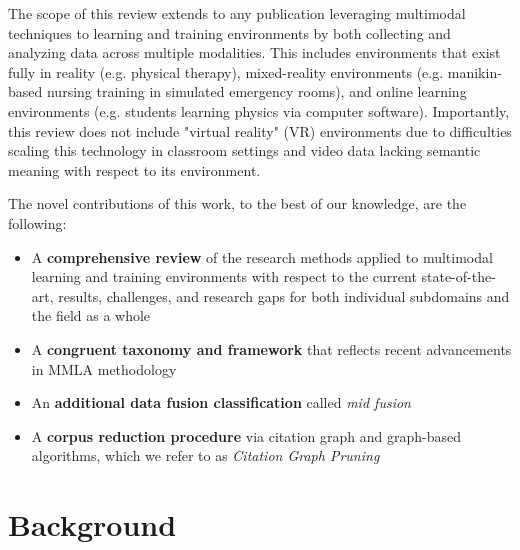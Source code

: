 \documentclass[manuscript,screen,review]{acmart}
\begin{document}
The scope of this review extends to any publication leveraging multimodal techniques to learning and training environments by both collecting and analyzing data across multiple modalities. This includes environments that exist fully in reality (e.g. physical therapy), mixed-reality environments (e.g. manikin-based nursing training in simulated emergency rooms), and online learning environments (e.g. students learning physics via computer software). Importantly, this review does not include "virtual reality" (VR) environments due to difficulties scaling this technology in classroom settings \cite{} and video data lacking semantic meaning with respect to its environment.

The novel contributions of this work, to the best of our knowledge, are the following: 
\begin{itemize}
    \item A \textbf{comprehensive review} of the research methods applied to multimodal learning and training environments with respect to the current state-of-the-art, results, challenges, and research gaps for both individual subdomains and the field as a whole
    \item A \textbf{congruent taxonomy and framework} that reflects recent advancements in MMLA methodology
    \item An \textbf{additional data fusion classification} called \textit{mid fusion}
    \item A \textbf{corpus reduction procedure} via citation graph and graph-based algorithms, which we refer to as \textit{Citation Graph Pruning}
\end{itemize}


\section{Background} \label{sec:background}
\end{document}
